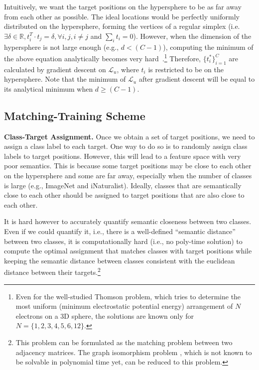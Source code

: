 Intuitively, we want the target positions on the hypersphere to be as far away from each other as possible. The ideal locations would be perfectly uniformly distributed on the hypersphere, forming the vertices of a regular simplex (i.e. $\exists \delta \in \mathbb{R}, t_i^T\cdot t_j = \delta, \forall i,j, i\neq j$ and $\sum\limits_i t_i = 0$)\cite{graf2021dissecting}. 
However, when the dimension of the hypersphere is not large enough (e.g., $d<(C-1)$), computing the minimum of the above equation analytically becomes very hard~\cite{graf2021dissecting}.\footnote{Even for the well-studied Thomson problem, which tries to determine the most uniform (minimum electrostatic potential energy) arrangement of $N$ electrons on a 3D sphere, the solutions are known only for $N = \{1,2,3,4,5,6,12\}$.} Therefore, $\{t^*_i\}_{i=1}^C$ are calculated by gradient descent on $\mathcal{L}_{u}$, where $t_i$ is restricted to be on the hypersphere. Note that the minimum of $\mathcal{L}_{u}$ after gradient descent will be equal to its analytical minimum when $d\geq(C-1)$.

\subsection{Matching-Training Scheme}

\noindent\textbf{Class-Target Assignment.} Once we obtain a set of target positions, we need to assign a class label to each target. One way to do so is to randomly assign class labels to target positions. However, this will lead to a feature space with very poor semantics. This is because some target positions may be close to each other on the hypersphere and some are far away, especially when the number of classes is large (e.g., ImageNet and iNaturalist). Ideally, classes that are semantically close to each other should be assigned to target positions that are also close to each other.

It is hard however to accurately quantify semantic closeness between two classes. Even if we could quantify it, i.e., there is a well-defined ``semantic distance'' between two classes, it is computationally hard (i.e., no poly-time solution)
to compute the optimal assignment that matches classes with target positions while keeping the semantic distance between classes consistent with the euclidean distance between their targets.\footnote{This problem can be formulated as the matching problem between two adjacency matrices. The graph isomorphism problem \cite{fortin1996graph}, which is not known to be solvable in polynomial time yet, can be reduced to this problem.} 

